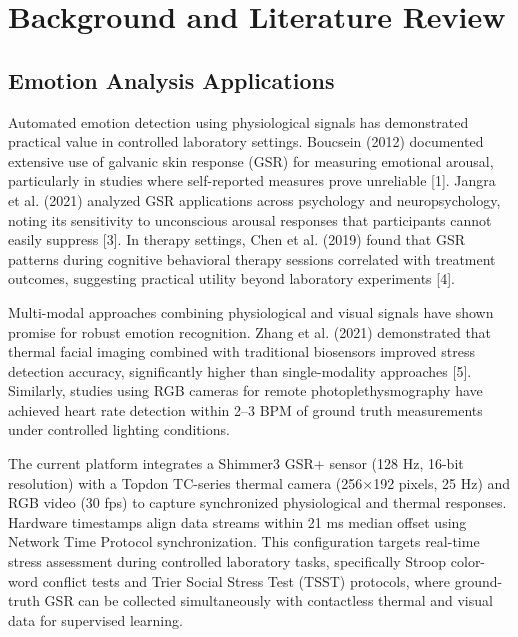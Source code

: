 \chapter{Background and Literature Review}

\section{Emotion Analysis Applications}
Automated emotion detection using physiological signals has demonstrated practical value in controlled laboratory settings. Boucsein (2012) documented extensive use of galvanic skin response (GSR) for measuring emotional arousal, particularly in studies where self-reported measures prove unreliable [1]. Jangra et al. (2021) analyzed GSR applications across psychology and neuropsychology, noting its sensitivity to unconscious arousal responses that participants cannot easily suppress [3]. In therapy settings, Chen et al. (2019) found that GSR patterns during cognitive behavioral therapy sessions correlated with treatment outcomes, suggesting practical utility beyond laboratory experiments [4].

Multi-modal approaches combining physiological and visual signals have shown promise for robust emotion recognition. Zhang et al. (2021) demonstrated that thermal facial imaging combined with traditional biosensors improved stress detection accuracy, significantly higher than single-modality approaches [5]. Similarly, studies using RGB cameras for remote photoplethysmography have achieved heart rate detection within 2--3 BPM of ground truth measurements under controlled lighting conditions.

The current platform integrates a Shimmer3 GSR+ sensor (128 Hz, 16-bit resolution) with a Topdon TC-series thermal camera (256$\times$192 pixels, 25 Hz) and RGB video (30 fps) to capture synchronized physiological and thermal responses. Hardware timestamps align data streams within 21 ms median offset using Network Time Protocol synchronization. This configuration targets real-time stress assessment during controlled laboratory tasks, specifically Stroop color-word conflict tests and Trier Social Stress Test (TSST) protocols, where ground-truth GSR can be collected simultaneously with contactless thermal and visual data for supervised learning.

